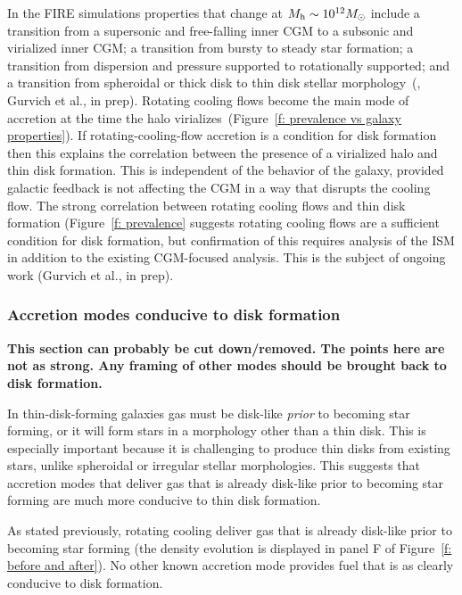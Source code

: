 \documentclass[fleqn,usenatbib]{mnras}
\begin{document}
In the FIRE simulations properties that change at $M_{\rm h}\sim10^{12} M_\odot$ include a transition from a supersonic and free-falling inner CGM to a subsonic and virialized inner CGM;
a transition from bursty to steady star formation;
a transition from dispersion and pressure supported to rotationally supported;
and a transition from spheroidal or thick disk to thin disk stellar morphology~(\citealt{El-Badry2018a, Stern2020, Yu2021}, Gurvich et al., in prep).
Rotating cooling flows become the main mode of accretion at the time the halo virializes~(Figure~\ref{f: prevalence vs galaxy properties}).
If rotating-cooling-flow accretion is a condition for disk formation then this explains the correlation between the presence of a virialized halo and thin disk formation.
This is independent of the behavior of the galaxy, provided galactic feedback is not affecting the CGM in a way that disrupts the cooling flow.
The strong correlation between rotating cooling flows and thin disk formation (Figure~\ref{f: prevalence} suggests rotating cooling flows are a sufficient condition for disk formation, but confirmation of this requires analysis of the ISM in addition to the existing CGM-focused analysis.
This is the subject of ongoing work (Gurvich et al., in prep).

\subsubsection{Accretion modes conducive to disk formation}
\label{s: disk formation -- conducive}

\textbf{
This section can probably be cut down/removed.
The points here are not as strong.
Any framing of other modes should be brought back to disk formation.
}


In thin-disk-forming galaxies gas must be disk-like \textit{prior} to becoming star forming, or it will form stars in a morphology other than a thin disk.
This is especially important because it is challenging to produce thin disks from existing stars, unlike spheroidal or irregular stellar morphologies.
This suggests that accretion modes that deliver gas that is already disk-like prior to becoming star forming are much more conducive to thin disk formation.

As stated previously, rotating cooling deliver gas that is already disk-like prior to becoming star forming (the density evolution is displayed in panel F of Figure~\ref{f: before and after}).
No other known accretion mode provides fuel that is as clearly conducive to disk formation.
\end{document}
